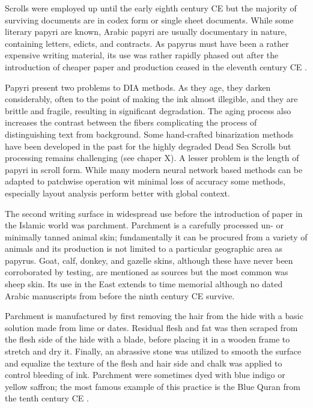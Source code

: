 Scrolls were employed up until the early eighth century CE but the majority of
surviving documents are in codex form or single sheet documents\cite[pg.
30]{deroche2006islamic}. While some literary papyri are known, Arabic papyri
are usually documentary in nature, containing letters, edicts, and contracts.
As papyrus must have been a rather expensive writing material, its use was
rather rapidly phased out after the introduction of cheaper paper and
production ceased in the eleventh century CE \cite[pg.
193-194]{gacek2009arabic}. 

Papyri present two problems to DIA methods. As they age, they darken
considerably, often to the point of making the ink almost illegible, and they
are brittle and fragile, resulting in significant degradation. The aging
process also increases the contrast between the fibers complicating the process
of distinguishing text from background. Some hand-crafted binarization methods
have been developed in the past for the highly degraded Dead Sea Scrolls
\cite{dhali2017digital, lavee2013computer} but processing remains challenging
(see chaper X). A lesser problem is the length of papyri in scroll form. While
many modern neural network based methods can be adapted to patchwise operation
wit minimal loss of accuracy some methods, especially layout analysis perform
better with global context.

The second writing surface in widespread use before the introduction of paper
in the Islamic world was parchment. Parchment is a carefully processed un- or
minimally tanned animal skin; fundamentally it can be procured from a variety
of animals and its production is not limited to a particular geographic area as
papyrus. Goat, calf, donkey, and gazelle skins, although these have never been
corroborated by testing, are mentioned as sources but the most common was sheep
skin\cite[pg. 44]{blair2006islamic}. Its use in the East extends to time
memorial although no dated Arabic manuscripts from before the ninth century CE
survive\cite[pg.33]{deroche2006islamic}. 

Parchment is manufactured by first removing the hair from the hide with a basic
solution made from lime or dates. Residual flesh and fat was then scraped from
the flesh side of the hide with a blade, before placing it in a wooden frame to
stretch and dry it. Finally, an abrassive stone was utilized to smooth the
surface and equalize the texture of the flesh and hair side and chalk was
applied to control bleeding of ink. Parchment were sometimes dyed with blue
indigo or yellow saffron; the most famous example of this practice is the Blue
Quran from the tenth century CE \cite[pg. 195-196]{gacek2009arabic}.

